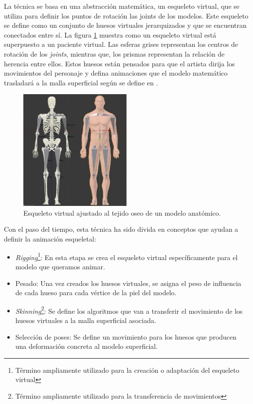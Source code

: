 La técnica se basa en una abstracción matemática, un esqueleto virtual, que se utiliza para definir los puntos de rotación las \ac{joints} de los modelos. Este esqueleto se define como un conjunto de huesos virtuales jerarquizados y que se encuentran conectados entre sí. La figura \ref{fig:virtualskeleton} muestra como un esqueleto virtual está superpuesto a un paciente virtual. Las esferas grises representan los centros de rotación de los \emph{\ac{joints}}, mientras que, los prismas representan la relación de herencia entre ellos. Estos huesos están pensados para que el artista dirija los movimientos del personaje y defina animaciones que el modelo matemático trasladará a la malla superficial según se define en \cite{thalmann88}. 

\begin{figure}[h]
   \centering
    \includegraphics[width=0.5\textwidth]{IMG/virtualskeleton.png}
    \caption{Esqueleto virtual ajustado al tejido oseo de un modelo anatómico.}
   \label{fig:virtualskeleton}
\end{figure}

Con el paso del tiempo, esta técnica ha sido divida en conceptos que ayudan a definir la animación esqueletal:

\begin{itemize}
    \item \emph{Rigging}\footnote{Término ampliamente utilizado para la creación o adaptación del esqueleto virtual}: En esta etapa se crea el esqueleto virtual específicamente para el modelo que queramos animar.
    \item Pesado: Una vez creados los huesos virtuales, se asigna el peso de influencia de cada hueso para cada vértice de la piel del modelo.
    \item \emph{Skinning}\footnote{Término ampliamente utilizado  para la transferencia de movimientos}: Se define los algoritmos que van a transferir el movimiento de los huesos virtuales a la malla superficial asociada. 
    \item Selección de poses: Se define un movimiento para los huesos que producen una deformación concreta al modelo superficial.
\end{itemize}

